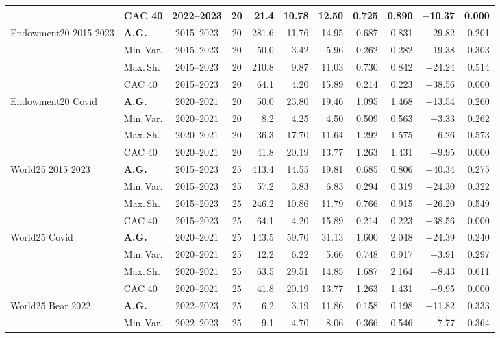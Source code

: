 \begin{longtable}{p{2.6cm} l c c r r r r r r r}
 & CAC 40 & 2022--2023 & 20 & 21.4 & 10.78 & 12.50 & 0.725 & 0.890 & $-$10.37 & 0.000 \\
\midrule
Endowment20 2015 2023 & \textbf{A.G.} & 2015--2023 & 20 & 281.6 & 11.76 & 14.95 & 0.687 & 0.831 & $-$29.82 & 0.201 \\
 & Min.\,Var. & 2015--2023 & 20 & 50.0 & 3.42 & 5.96 & 0.262 & 0.282 & $-$19.38 & 0.303 \\
 & Max.\,Sh. & 2015--2023 & 20 & 210.8 & 9.87 & 11.03 & 0.730 & 0.842 & $-$24.24 & 0.514 \\
 & CAC 40 & 2015--2023 & 20 & 64.1 & 4.20 & 15.89 & 0.214 & 0.223 & $-$38.56 & 0.000 \\
\midrule
Endowment20 Covid & \textbf{A.G.} & 2020--2021 & 20 & 50.0 & 23.80 & 19.46 & 1.095 & 1.468 & $-$13.54 & 0.260 \\
 & Min.\,Var. & 2020--2021 & 20 & 8.2 & 4.25 & 4.50 & 0.509 & 0.563 & $-$3.33 & 0.262 \\
 & Max.\,Sh. & 2020--2021 & 20 & 36.3 & 17.70 & 11.64 & 1.292 & 1.575 & $-$6.26 & 0.573 \\
 & CAC 40 & 2020--2021 & 20 & 41.8 & 20.19 & 13.77 & 1.263 & 1.431 & $-$9.95 & 0.000 \\
\midrule
World25 2015 2023 & \textbf{A.G.} & 2015--2023 & 25 & 413.4 & 14.55 & 19.81 & 0.685 & 0.806 & $-$40.34 & 0.275 \\
 & Min.\,Var. & 2015--2023 & 25 & 57.2 & 3.83 & 6.83 & 0.294 & 0.319 & $-$24.30 & 0.322 \\
 & Max.\,Sh. & 2015--2023 & 25 & 246.2 & 10.86 & 11.79 & 0.766 & 0.915 & $-$26.20 & 0.549 \\
 & CAC 40 & 2015--2023 & 25 & 64.1 & 4.20 & 15.89 & 0.214 & 0.223 & $-$38.56 & 0.000 \\
\midrule
World25 Covid & \textbf{A.G.} & 2020--2021 & 25 & 143.5 & 59.70 & 31.13 & 1.600 & 2.048 & $-$24.39 & 0.240 \\
 & Min.\,Var. & 2020--2021 & 25 & 12.2 & 6.22 & 5.66 & 0.748 & 0.917 & $-$3.91 & 0.297 \\
 & Max.\,Sh. & 2020--2021 & 25 & 63.5 & 29.51 & 14.85 & 1.687 & 2.164 & $-$8.43 & 0.611 \\
 & CAC 40 & 2020--2021 & 25 & 41.8 & 20.19 & 13.77 & 1.263 & 1.431 & $-$9.95 & 0.000 \\
\midrule
World25 Bear 2022 & \textbf{A.G.} & 2022--2023 & 25 & 6.2 & 3.19 & 11.86 & 0.158 & 0.198 & $-$11.82 & 0.333 \\
 & Min.\,Var. & 2022--2023 & 25 & 9.1 & 4.70 & 8.06 & 0.366 & 0.546 & $-$7.77 & 0.364 \\

\end{longtable}
